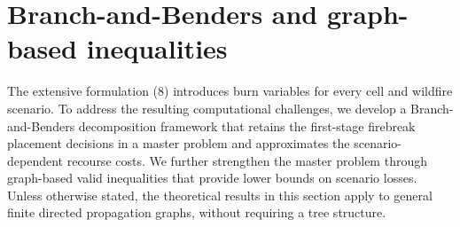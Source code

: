 \documentclass{itor}
\begin{document}




\section{Branch-and-Benders and graph-based inequalities}
\label{sec:branch_benders}

The extensive formulation (8) introduces burn variables for every cell and wildfire scenario. To address the resulting computational challenges, we develop a Branch-and-Benders decomposition framework that retains the first-stage firebreak placement decisions in a master problem and approximates the scenario-dependent recourse costs. We further strengthen the master problem through graph-based valid inequalities that provide lower bounds on scenario losses. Unless otherwise stated, the theoretical results in this section apply to general finite directed propagation graphs, without requiring a tree structure.
\end{document}
